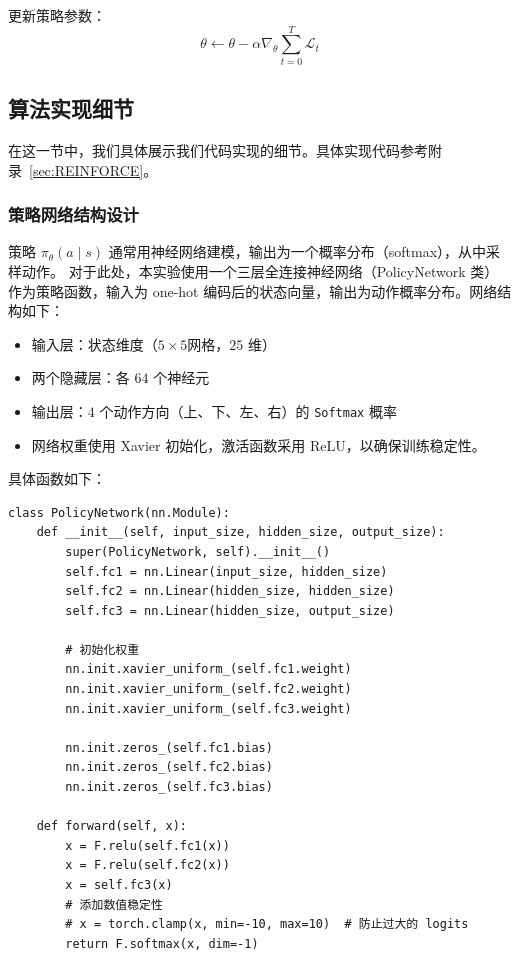 \begin{algorithm}[htbp]
{    更新策略参数：
    \[
    \theta \leftarrow \theta - \alpha \nabla_\theta \sum_{t=0}^T \mathcal{L}_t
    \]

}
\Return{\( \theta \)}
\end{algorithm}

\subsection{算法实现细节}

在这一节中，我们具体展示我们代码实现的细节。具体实现代码参考附录~\ref{sec:REINFORCE}。

\subsubsection{策略网络结构设计}

策略 \(\pi_\theta \left( a \mid s\right)\) 通常用神经网络建模，输出为一个概率分布（softmax），从中采样动作。
对于此处，本实验使用一个三层全连接神经网络（\textsf{PolicyNetwork} 类）作为策略函数，输入为 one-hot 编码后的状态向量，输出为动作概率分布。网络结构如下：
\begin{itemize}
    \item 输入层：状态维度（\(5 \times 5\)网格，\(25\) 维）
    \item 两个隐藏层：各 \(64\) 个神经元
    \item 输出层：\(4\) 个动作方向（上、下、左、右）的 \texttt{Softmax} 概率
    \item 网络权重使用 Xavier 初始化，激活函数采用 ReLU，以确保训练稳定性。
\end{itemize}
具体函数如下：
\begin{verbatim}
class PolicyNetwork(nn.Module):
    def __init__(self, input_size, hidden_size, output_size):
        super(PolicyNetwork, self).__init__()
        self.fc1 = nn.Linear(input_size, hidden_size)
        self.fc2 = nn.Linear(hidden_size, hidden_size)
        self.fc3 = nn.Linear(hidden_size, output_size)

        # 初始化权重
        nn.init.xavier_uniform_(self.fc1.weight)
        nn.init.xavier_uniform_(self.fc2.weight)
        nn.init.xavier_uniform_(self.fc3.weight)

        nn.init.zeros_(self.fc1.bias)
        nn.init.zeros_(self.fc2.bias)
        nn.init.zeros_(self.fc3.bias)

    def forward(self, x):
        x = F.relu(self.fc1(x))
        x = F.relu(self.fc2(x))
        x = self.fc3(x)
        # 添加数值稳定性
        # x = torch.clamp(x, min=-10, max=10)  # 防止过大的 logits
        return F.softmax(x, dim=-1)
\end{verbatim}

